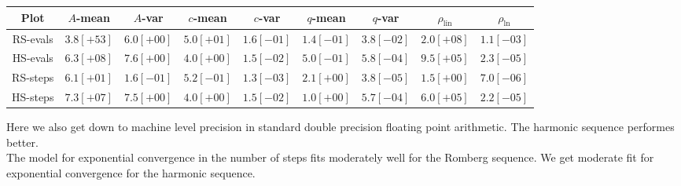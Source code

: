 \begin{table}[H]
    \centering
    \small
    \begin{tabular}{c||c|c|c|c|c|c|c|c}
Plot & \(A\)-mean & \(A\)-var & \(c\)-mean & \(c\)-var & \(q\)-mean & \(q\)-var & \(\rho_{\operatorname{lin}}\) & \(\rho_{\ln}\)\\\hline
\rowcolor{red}
RS-evals & \(3.8[+53]\) & \(6.0[+00]\) & \(5.0[+01]\) & \(1.6[-01]\) & \(1.4[-01]\) & \(3.8[-02]\) & \(2.0[+08]\) & \(1.1[-03]\) \\
\rowcolor{green}
HS-evals & \(6.3[+08]\) & \(7.6[+00]\) & \(4.0[+00]\) & \(1.5[-02]\) & \(5.0[-01]\) & \(5.8[-04]\) & \(9.5[+05]\) & \(2.3[-05]\) \\
\rowcolor{green}
RS-steps & \(6.1[+01]\) & \(1.6[-01]\) & \(5.2[-01]\) & \(1.3[-03]\) & \(2.1[+00]\) & \(3.8[-05]\) & \(1.5[+00]\) & \(7.0[-06]\) \\
\rowcolor{green}
HS-steps & \(7.3[+07]\) & \(7.5[+00]\) & \(4.0[+00]\) & \(1.5[-02]\) & \(1.0[+00]\) & \(5.7[-04]\) & \(6.0[+05]\) & \(2.2[-05]\) \\
    \end{tabular}
    \label{tab:my_label}
\end{table}

Here we also get down to machine level precision in standard double precision floating point arithmetic. The harmonic sequence performes better.\\

The model for exponential convergence in the number of steps fits moderately well for the Romberg sequence. We get moderate fit for exponential convergence for the harmonic sequence.